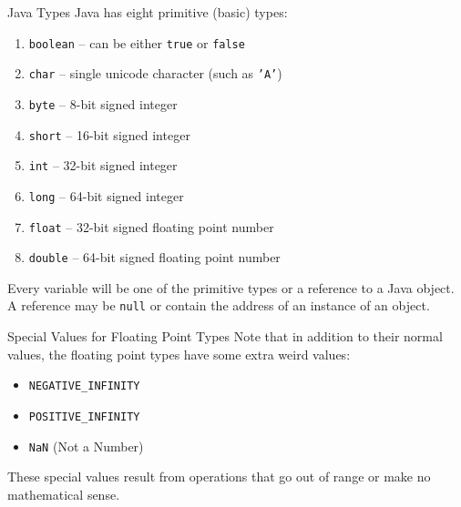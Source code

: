 \documentclass[aspectratio=169]{beamer}
\begin{document}
\begin{frame}{Java Types}
Java has eight primitive (basic) types:
\begin{enumerate}
\item \texttt{boolean} -- can be either \texttt{true} or \texttt{false}
\item \texttt{char} -- single unicode character (such as \texttt{'A'})
\item \texttt{byte} -- 8-bit signed integer
\item \texttt{short} -- 16-bit signed integer
\item \texttt{int} -- 32-bit signed integer
\item \texttt{long} -- 64-bit signed integer
\item \texttt{float} -- 32-bit signed floating point number
\item \texttt{double} -- 64-bit signed floating point number
\end{enumerate}
Every variable will be one of the primitive types or a reference to a Java object. A reference may be \texttt{null} or contain the address of an instance of an object.
\end{frame}



\begin{frame}{Special Values for Floating Point Types}
Note that in addition to their normal values, the floating point types have some extra weird values: \\
\vspace{1em}
\begin{itemize}
\item \texttt{NEGATIVE\_INFINITY}
\item \texttt{POSITIVE\_INFINITY} 
\item \texttt{NaN} (Not a Number)
\end{itemize}
\vspace{1em}
These special values result from operations that go out of range or make no mathematical sense. \\
\end{frame}
\end{document}
